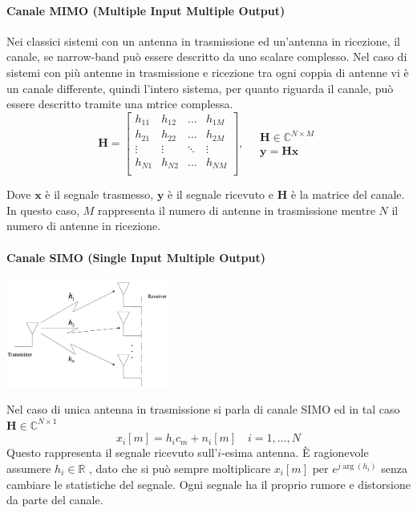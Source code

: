 \paragraph*{Canale MIMO (Multiple Input Multiple Output)}


Nei classici sistemi con un antenna in trasmissione ed un'antenna in ricezione, il canale, se narrow-band può essere descritto da uno scalare complesso.
Nel caso di sistemi con più antenne in trasmissione e ricezione tra ogni coppia di antenne vi è un canale differente, quindi l'intero sistema, per quanto riguarda il canale, può essere descritto tramite una mtrice complessa.
\[ 
    \mathbf{H} = 
    \begin{bmatrix}
        h_{11} & h_{12} & \ldots & h_{1M} \\
        h_{21} & h_{22} & \ldots & h_{2M} \\
        \vdots & \vdots & \ddots & \vdots \\
        h_{N1} & h_{N2} & \ldots & h_{NM} \\
    \end{bmatrix}
    , \quad
    \begin{array}{ll}
            \mathbf{H} \in \mathbb{C}^{N \times M} \\
            \mathbf{y} = \mathbf{Hx} 
    \end{array}
\]

Dove $\mathbf{x}$ è il segnale trasmesso, $\mathbf{y}$ è il segnale ricevuto e $\mathbf{H}$ è la matrice del canale. In questo caso, $M$ rappresenta il numero di antenne in trasmissione mentre $N$ il numero di antenne in ricezione.
\paragraph*{Canale SIMO (Single Input Multiple Output)}
\begin{center}
    \includegraphics[width=0.4\textwidth]{imgs/simo.jpg}
\end{center}
Nel caso di unica antenna in trasmissione si parla di canale SIMO ed in tal caso $\mathbf{H} \in \mathbb{C}^{N \times 1}$
\[
    x_i[m] = h_i c_m + n_i[m] \quad i = 1, \ldots, N
\]
Questo rappresenta il segnale ricevuto sull'$i$-esima antenna.
È ragionevole assumere $h_i \in \mathbb{R}$ , dato che si può sempre moltiplicare $x_i[m]$ per $ e^{j\arg(h_i)} $ senza cambiare le statistiche del segnale.
Ogni segnale ha il proprio rumore e distorsione da parte del canale.

